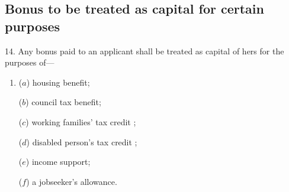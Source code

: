 \documentclass[12pt,a4paper]{article}
\begin{document}
%
%
%
%
%
%
%

\subsection[14. Bonus to be treated as capital for certain purposes]{Bonus to be treated as capital for certain purposes}

14.  Any bonus paid to an applicant shall be treated as capital of hers for the purposes of—
\begin{enumerate}\item[]
($a$) housing benefit;

($b$) council tax benefit;

($c$) 
working families' tax credit%
;

($d$) 
disabled person's tax credit%
;

($e$) income support;

($f$) a jobseeker’s allowance.
\end{enumerate}
\end{document}
